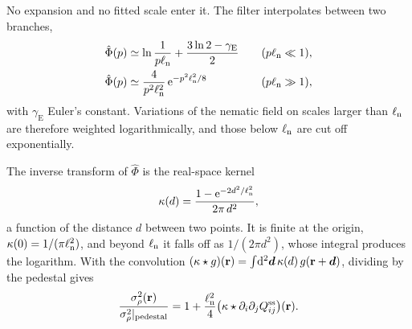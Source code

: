 \documentclass[aps,pre,reprint,superscriptaddress,longbibliography,nofootinbib
]{revtex4-2}
\begin{document}
No expansion and no fitted scale enter it. 
The filter interpolates between two branches,
\begin{alignat}{2}
  \label{eq:Phi-asymptotics}
  \hat\Phi(p)&\simeq\ln\frac1{p\ell_{\rm n}}+\frac{3\ln2-\gamma_\mathrm{E}}2
  \quad &(p\ell_{\rm n}\ll1),
  \nonumber\\
  \hat\Phi(p)&\simeq\frac4{p^2\ell_{\rm n}^2}\,\mathrm{e}^{-p^2\ell_{\rm n}^2/8}
  \quad &(p\ell_{\rm n}\gg1),
\end{alignat}
with $\gamma_\mathrm{E}$ Euler's constant. Variations of
the nematic field on scales larger than $\ell_{\rm n}$ are
therefore weighted logarithmically, and those below $\ell_{\rm n}$
are cut off exponentially.

The inverse transform of $\hat\Phi$ is the real-space
kernel
\begin{equation}
  \label{eq:kappa-real}
  \kappa(d) = \frac{1-\mathrm{e}^{-2d^2/\ell_{\rm n}^2}}{2\pi\,d^2},
\end{equation}
a function of the distance $d$ between two points. It is
finite at the origin, $\kappa(0)=1/(\pi\ell_{\rm n}^2)$, and
beyond $\ell_{\rm n}$ it falls off as $1/(2\pi d^2)$, whose
integral produces the logarithm. With the convolution
$(\kappa\star g)(\mathbf{r})=\int\!\mathrm{d}^2\boldsymbol d\,\kappa(d)\,g(\mathbf{r}+\boldsymbol
d)$, dividing by the pedestal gives
\begin{equation}
  \label{eq:variance-kernel}
  \frac{\sigma_\rho^2(\mathbf{r})}{\sigma_\rho^2|_\text{pedestal}}
  = 1 + \frac{\ell_{\rm n}^2}{4}\bigl(\kappa\star\partial_i\partial_jQ^{\mathrm{ss}}_{ij}\bigr)(\mathbf{r}).
\end{equation}
\end{document}
